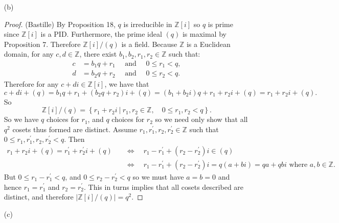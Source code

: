 \documentclass[10pt]{article}
\newcommand{\Z}{\mathbb{Z}}
\begin{document}
\begin{itemize}
\begin{enumerate}
\begin{proof}
\underline{Short version} Because $\Z[i]$ is a Euclidean domain, for
any $c \in \Z[i]$, there exist $\alpha, r \in \Z[i]$ such that:
$$c=\alpha(1+i)+r \quad \text{ where } \quad r=0 \quad \text{ or } \quad N(r)<N(1+i)=2.$$
If $r=0$ then $c \in (1+i)$, and if $N(r)=1$ then $r$ is a unit,
i.e. $r= \pm 1, \pm i$. We claim
$1+(1+i)=i+(1+i)=-1+(1+i)=-i+(1+i)$. Indeed note that $1-i=-i(1+i)
\in (1+i)$ so $1+(1+i)=i+(1+i)$, and similarly $1+i=1-(-i)=i-(-1)
\in (1+i)$ so $1+(1+i)=-i+(1+i)$ and $i+(1+i)=-1+(1+i)$. So all
these cosets are equal. Hence
$$\Z[i]/(1+i)=\left\{(1+i),1+(1+i)\right\}, $$ and so $\Z[i]/(1+i)$
is a field of order 2.
\end{proof}
\item[(b)]
\begin{proof} (Bastille) By Proposition 18, $q$ is irreducible in $\Z[i]$ so $q$ is prime since $\Z[i]$ is a PID. Furthermore, the prime ideal $(q)$ is maximal by Proposition 7. Therefore $\Z[i]/(q)$ is a field. Because $\Z$ is a Euclidean domain, for any $c,d \in \Z$, there exist $b_1,b_2,r_1,r_2 \in \Z$ such that:
\begin{align*}
c&=b_1q+r_1 \quad \text{ and } \quad 0 \leq r_1 < q, \\
d&=b_2q+r_2 \quad \text{ and } \quad 0 \leq r_2 < q.
\end{align*}
Therefore for any $c+di \in \Z[i]$, we have that $c+di+(q)= b_1q+r_1
+ (b_2q+r_2)i+(q)=(b_1+b_2i)q+r_1+r_2i+(q)= r_1+r_2i+(q).$ So
$$\Z[i]/(q)=\left\{r_1+r_2i \ | \ r_1,r_2 \in \Z, \quad 0 \leq r_1,r_2 < q \right\}. $$
So we have $q$ choices for $r_1$, and $q$ choices for $r_2$ so we
need only show that all $q^2$ cosets thus formed are distinct.
Assume $r_1,r_1^{'},r_2,r_2^{'} \in \Z$ such that $0 \leq
r_1,r_1^{'},r_2,r_2^{'} <q$. Then
\begin{align*}
r_1+r_2i+(q)=r_1^{'}+r_2^{'}i+(q) \quad &\Leftrightarrow \quad r_1-r_1^{'}+(r_2-r_2^{'})i \in (q) \\
                                                                                &\Leftrightarrow \quad r_1-r_1^{'}+(r_2-r_2^{'})i =q(a+bi)=qa+qbi \text{    where    } a,b \in \Z.
\end{align*}
But $0 \leq r_1-r_1^{'}<q$, and $0 \leq r_2-r_2^{'} < q$ so we must
have $a=b=0$ and hence $r_1=r_1^{'}$ and $r_2=r^{'}_2$. This in
turns implies that all cosets described are distinct, and therefore
$\left| \Z[i]/(q)\right|=q^2$.
\end{proof}
\item[(c)]

\end{enumerate}
\end{itemize}
\end{document}
